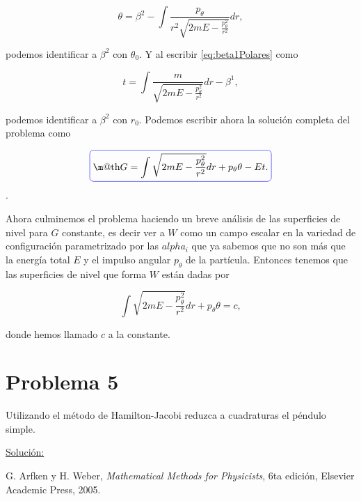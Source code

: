 \documentclass[a4paper,10pt]{article}
\makeatletter
\numberwithin{equation}{section}
\newcommand*{\boxcolor}{blue}
\renewcommand{\boxed}[1]{\textcolor{\boxcolor}{%
\tikz[baseline={([yshift=-1ex]current bounding box.center)}] \node [rectangle, minimum width=1ex,rounded corners,draw] {\normalcolor\m@th$\displaystyle#1$};}}
\makeatother
\begin{document}
\begin{equation}
 \theta =   \beta^2  - \int \frac{p_\theta}{r^2\sqrt{2mE - \frac{p_\theta^2}{r^2}}}dr,
\end{equation}

podemos identificar a $\beta^2$ con $\theta_0$. Y al escribir \eqref{eq:beta1Polares} 
como 

\begin{equation}
 t = \int \frac{m}{\sqrt{2mE - \frac{p_\theta^2}{r^2}}}dr - \beta^1,
\end{equation}

podemos identificar a $\beta^2$ con $r_0$. Podemos escribir ahora la solución 
completa del problema como

\begin{equation}
 \boxed{G = \int \sqrt{2mE - \frac{p_\theta^2}{r^2}} dr + p_\theta\theta - Et.}
\end{equation}.

Ahora culminemos el problema haciendo un breve análisis de las superficies de nivel 
para $G$ constante, es decir ver a $W$ como un campo escalar en la variedad de 
configuración parametrizado por las $alpha_i$ que ya sabemos que no son más que 
la energía total $E$ y el impulso angular $p_\theta$ de la partícula. Entonces tenemos 
que las superficies de nivel que forma $W$ están dadas por 

\begin{equation}
 \int \sqrt{2mE - \frac{p_\theta^2}{r^2}} dr + p_\theta\theta = c,
\end{equation}

donde hemos llamado $c$ a la constante.

\section{Problema 5}

Utilizando el método de Hamilton-Jacobi reduzca a cuadraturas el péndulo simple. 

\vspace{.3cm}

\underline{Solución:} \vspace{.3cm}

\begin{thebibliography}{10}
G. Arfken y H. Weber, \emph{Mathematical Methods for Physicists}, 6ta edición, Elsevier 
Academic Press, 2005.
\end{thebibliography}
\end{document}
